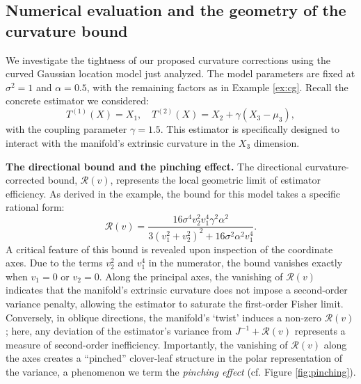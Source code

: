 \documentclass[pdflatex,sn-mathphys-num]{sn-jnl}%
\theoremstyle{thmstyleone}%
\theoremstyle{thmstyletwo}%
\theoremstyle{thmstylethree}%
\begin{document}
\subsection{Numerical evaluation and the geometry of the curvature bound}

We investigate the tightness of our proposed curvature corrections using the curved Gaussian location model just analyzed. The model parameters are fixed at $\sigma^2 = 1$ and $\alpha = 0.5$, with the remaining factors as in Example \ref{ex:cg}. Recall the concrete estimator we considered:
\[
T^{(1)}(X) = X_1, \quad T^{(2)}(X) = X_2 + \gamma(X_3 - \mu_3),
\]
with the coupling parameter $\gamma = 1.5$. This estimator is specifically designed to interact with the manifold's extrinsic curvature in the $X_3$ dimension.

\noindent
\textbf{The directional bound and the pinching effect.}
The directional curvature-corrected bound, $\mathcal{R}(v)$, represents the local geometric limit of estimator efficiency. As derived in the example, the bound for this model takes a specific rational form:
\[
\mathcal{R}(v) = \frac{16\sigma^4 v_2^2 v_1^4 \gamma^2 \alpha^2}{3(v_1^2 + v_2^2)^2 + 16\sigma^2 \alpha^2 v_1^4}.
\]
A critical feature of this bound is revealed upon inspection of the coordinate axes. Due to the terms $v_2^2$ and $v_1^4$ in the numerator, the bound vanishes exactly when $v_1 = 0$ or $v_2 = 0$. Along the principal axes, the vanishing of $\mathcal{R}(v)$ indicates that the manifold's extrinsic curvature does not impose a second-order variance penalty, allowing the estimator to saturate the first-order Fisher limit. Conversely, in oblique directions, the manifold's `twist' induces a non-zero $\mathcal{R}(v)$; here, any deviation of the estimator's variance from $J^{-1} + \mathcal{R}(v)$ represents a measure of second-order inefficiency. Importantly, the vanishing of \(\mathcal{R}(v)\) along the axes creates a ``pinched'' clover-leaf structure in the polar representation of the variance, a phenomenon we term the \textit{pinching effect} (cf. Figure \ref{fig:pinching}).
\end{document}
